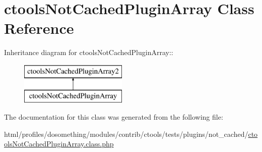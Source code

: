 \hypertarget{classctoolsNotCachedPluginArray}{
\section{ctoolsNotCachedPluginArray Class Reference}
\label{classctoolsNotCachedPluginArray}
}
Inheritance diagram for ctoolsNotCachedPluginArray::\begin{figure}[H]
\begin{center}
\leavevmode
\includegraphics[height=2cm]{classctoolsNotCachedPluginArray}
\end{center}
\end{figure}


The documentation for this class was generated from the following file:\begin{DoxyCompactItemize}
\item 
html/profiles/dosomething/modules/contrib/ctools/tests/plugins/not\_\-cached/\hyperlink{ctoolsNotCachedPluginArray_8class_8php}{ctoolsNotCachedPluginArray.class.php}\end{DoxyCompactItemize}
